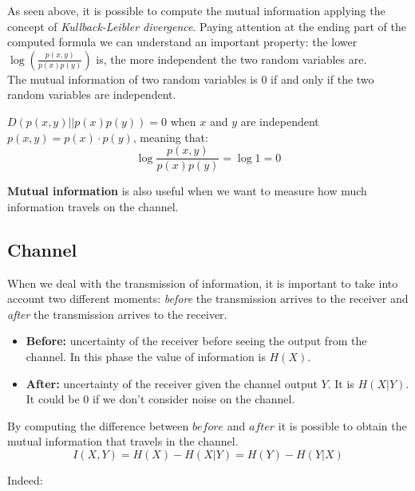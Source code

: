 As seen above, it is possible to compute the mutual information applying the concept of \textit{Kullback-Leibler divergence}. Paying attention at the ending part of the computed formula we can understand an important property: the lower $\log\left(\frac{p(x,y)}{p(x)p(y)} \right)$ is, the more independent the two random variables are.\\
The mutual information of two random variables is 0 if and only if the two random variables are independent.

$D(p(x,y)||p(x)p(y)) = 0$ when $x$ and $y$ are independent $p(x,y) = p(x)\cdot p(y)$, meaning that: 
$$\log \frac{p(x,y)}{p(x)p(y)} = \log 1 = 0 $$

\textbf{Mutual information} is also useful when we want to measure how much information travels on the channel.
\subsection{Channel}
When we deal with the transmission of information, it is important to take into account two different moments: \textit{before} the transmission arrives to the receiver and \textit{after} the transmission arrives to the receiver. 
\begin{itemize}
	\item \textbf{Before:} uncertainty of the receiver before seeing the output from the channel. In this phase the value of information is $H(X)$.
	\item \textbf{After:} uncertainty of the receiver given the channel output $Y$. It is $H(X|Y)$. It could be 0 if we don't consider noise on the channel.
\end{itemize}
By computing the difference between $before$ and $after$ it is possible to obtain the mutual information that travels in the channel.
$$I(X,Y) = H(X) - H(X|Y) = H(Y) - H(Y|X)$$

Indeed:

